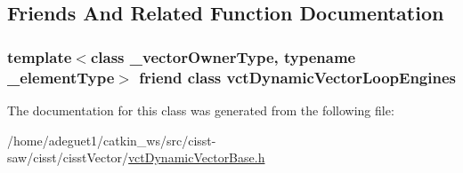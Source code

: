 \subsection{Friends And Related Function Documentation}
\hypertarget{classvct_dynamic_vector_base_af017ae93f1ac2b0bb0431a0aedb79ca1}{
\subsubsection[{vct\-Dynamic\-Vector\-Loop\-Engines}]{\setlength{\rightskip}{0pt plus 5cm}template$<$class \-\_\-vector\-Owner\-Type, typename \-\_\-element\-Type$>$ friend class {\bf vct\-Dynamic\-Vector\-Loop\-Engines}\hspace{0.3cm}{\ttfamily [friend]}}}\label{classvct_dynamic_vector_base_af017ae93f1ac2b0bb0431a0aedb79ca1}


The documentation for this class was generated from the following file\-:\begin{DoxyCompactItemize}
\item 
/home/adeguet1/catkin\-\_\-ws/src/cisst-\/saw/cisst/cisst\-Vector/\hyperlink{vct_dynamic_vector_base_8h}{vct\-Dynamic\-Vector\-Base.\-h}\end{DoxyCompactItemize}
